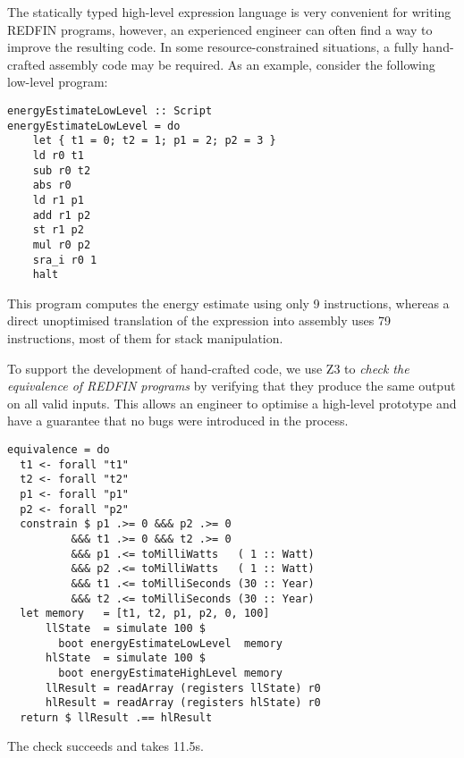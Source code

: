 The statically typed high-level expression language is very convenient for
writing REDFIN programs, however, an experienced engineer can often find a way
to improve the resulting code. In some resource-constrained situations, a fully
hand-crafted assembly code may be required. As an example, consider the
following low-level program:

\begin{verbatim}
energyEstimateLowLevel :: Script
energyEstimateLowLevel = do
    let { t1 = 0; t2 = 1; p1 = 2; p2 = 3 }
    ld r0 t1
    sub r0 t2
    abs r0
    ld r1 p1
    add r1 p2
    st r1 p2
    mul r0 p2
    sra_i r0 1
    halt
\end{verbatim}
\label{energyEstimateLowLevel}

This program computes the energy estimate using only 9 instructions, whereas
a direct unoptimised translation of the  expression into
assembly uses 79 instructions, most of them for stack manipulation.

To support the development of hand-crafted code, we use Z3 to \emph{check the
equivalence of REDFIN programs} by verifying that they produce
the same output on all valid inputs. This allows an engineer to
optimise a high-level prototype and have a guarantee that no bugs were
introduced in the process.

\begin{verbatim}
equivalence = do
  t1 <- forall "t1"
  t2 <- forall "t2"
  p1 <- forall "p1"
  p2 <- forall "p2"
  constrain $ p1 .>= 0 &&& p2 .>= 0
          &&& t1 .>= 0 &&& t2 .>= 0
          &&& p1 .<= toMilliWatts   ( 1 :: Watt)
          &&& p2 .<= toMilliWatts   ( 1 :: Watt)
          &&& t1 .<= toMilliSeconds (30 :: Year)
          &&& t2 .<= toMilliSeconds (30 :: Year)
  let memory   = [t1, t2, p1, p2, 0, 100]
      llState  = simulate 100 $
        boot energyEstimateLowLevel  memory
      hlState  = simulate 100 $
        boot energyEstimateHighLevel memory
      llResult = readArray (registers llState) r0
      hlResult = readArray (registers hlState) r0
  return $ llResult .== hlResult
\end{verbatim}

\noindent
The  check succeeds and takes 11.5s.


